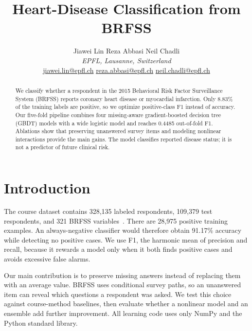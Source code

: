 \documentclass[10pt,conference,compsocconf]{IEEEtran}
\begin{document}
\title{Heart-Disease Classification from BRFSS}

\author{
  Jiawei Lin \quad Reza Abbasi \quad Neil Chadli\\
  \textit{EPFL, Lausanne, Switzerland}\\
  {\small
  \href{mailto:jiawei.lin@epfl.ch}{jiawei.lin@epfl.ch} \quad
  \href{mailto:reza.abbasi@epfl.ch}{reza.abbasi@epfl.ch} \quad
  \href{mailto:neil.chadli@epfl.ch}{neil.chadli@epfl.ch}}
}

\maketitle

\begin{abstract}
We classify whether a respondent in the 2015 Behavioral Risk Factor
Surveillance System (BRFSS) reports coronary heart disease or myocardial
infarction. Only 8.83\% of the training labels are positive, so we optimize
positive-class F1 instead of accuracy. Our five-fold pipeline combines four
missing-aware gradient-boosted decision tree (GBDT) models with a wide
logistic model and reaches 0.4485 out-of-fold F1. Ablations show that
preserving unanswered survey items and modeling nonlinear interactions
provide the main gains. The model classifies reported disease status; it is
not a predictor of future clinical risk.
\end{abstract}

\section{Introduction}

The course dataset contains 328,135 labeled respondents, 109,379 test
respondents, and 321 BRFSS variables~\cite{cdc2015}. There are 28,975 positive
training examples. An always-negative classifier would therefore obtain
91.17\% accuracy while detecting no positive cases. We use F1, the harmonic
mean of precision and recall, because it rewards a model only when it both
finds positive cases and avoids excessive false alarms.

Our main contribution is to preserve missing answers instead of replacing
them with an average value. BRFSS uses conditional survey paths, so an
unanswered item can reveal which questions a respondent was asked. We test
this choice against course-method baselines, then evaluate whether a nonlinear
model and an ensemble add further improvement. All learning code uses only
NumPy and the Python standard library.
\end{document}
